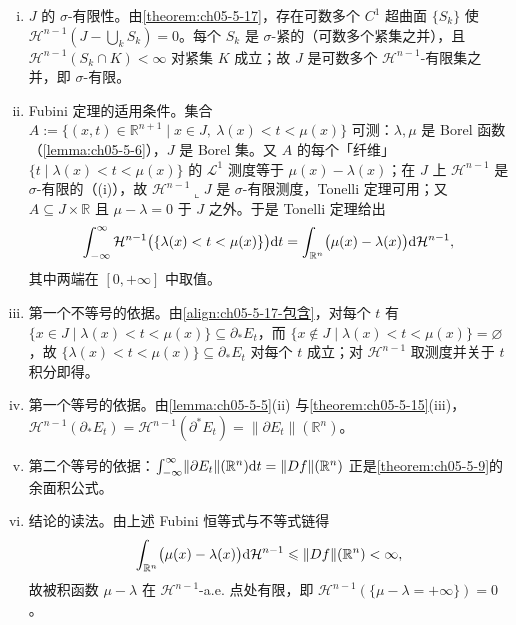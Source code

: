 \documentclass[../../main.tex]{subfiles}%
\begin{document}
\begin{remark}\label{remark:ch05-thm-5-18-论证二}
\begin{enumerate}[(i)]
\item $J$ 的 $\sigma$-有限性。由\cref{theorem:ch05-5-17}，存在可数多个 $C^1$ 超曲面 $\{S_k\}$ 使 $\mathcal{H}^{n-1}(J-\bigcup_{k}S_k)=0$。每个 $S_k$ 是 $\sigma$-紧的（可数多个紧集之并），且 $\mathcal{H}^{n-1}(S_k\cap K)<\infty$ 对紧集 $K$ 成立；故 $J$ 是可数多个 $\mathcal{H}^{n-1}$-有限集之并，即 $\sigma$-有限。%
\item Fubini 定理的适用条件。集合 $A:=\{(x,t)\in\mathbb{R}^{n+1}\mid x\in J,\ \lambda(x)<t<\mu(x)\}$ 可测：$\lambda,\mu$ 是 Borel 函数（\cref{lemma:ch05-5-6}），$J$ 是 Borel 集。又 $A$ 的每个「纤维」$\{t\mid\lambda(x)<t<\mu(x)\}$ 的 $\mathcal{L}^1$ 测度等于 $\mu(x)-\lambda(x)$；在 $J$ 上 $\mathcal{H}^{n-1}$ 是 $\sigma$-有限的（(i)），故 $\mathcal{H}^{n-1}\llcorner J$ 是 $\sigma$-有限测度，Tonelli 定理可用；又 $A\subseteq J\times\mathbb{R}$ 且 $\mu-\lambda=0$ 于 $J$ 之外。于是 Tonelli 定理给出%
\begin{align*}
\int_{-\infty}^{\infty}\mathcal{H}^{n-1}\bigl(\{\lambda(x)<t<\mu(x)\}\bigr)\mathrm{d} t=\int_{\mathbb{R}^n}\bigl(\mu(x)-\lambda(x)\bigr)\mathrm{d}\mathcal{H}^{n-1} ,
\end{align*}
其中两端在 $[0,+\infty]$ 中取值。
\item 第一个不等号的依据。由\eqref{align:ch05-5-17-包含}，对每个 $t$ 有 $\{x\in J\mid\lambda(x)<t<\mu(x)\}\subseteq\partial_*E_t$，而 $\{x\notin J\mid\lambda(x)<t<\mu(x)\}=\varnothing$，故 $\{\lambda(x)<t<\mu(x)\}\subseteq\partial_*E_t$ 对每个 $t$ 成立；对 $\mathcal{H}^{n-1}$ 取测度并关于 $t$ 积分即得。
\item 第一个等号的依据。由\cref{lemma:ch05-5-5}(ii) 与\cref{theorem:ch05-5-15}(iii)，$\mathcal{H}^{n-1}(\partial_*E_t)=\mathcal{H}^{n-1}(\partial^*E_t)=\lVert\partial E_t\rVert(\mathbb{R}^n)$。%
\item 第二个等号的依据：$\int_{-\infty}^{\infty}\lVert\partial E_t\rVert(\mathbb{R}^n)\mathrm{d} t=\lVert Df\rVert(\mathbb{R}^n)$ 正是\cref{theorem:ch05-5-9}的余面积公式。%
\item 结论的读法。由上述 Fubini 恒等式与不等式链得
\begin{align*}
\int_{\mathbb{R}^n}\bigl(\mu(x)-\lambda(x)\bigr)\mathrm{d}\mathcal{H}^{n-1}\leqslant\lVert Df\rVert(\mathbb{R}^n)<\infty ,
\end{align*}
故被积函数 $\mu-\lambda$ 在 $\mathcal{H}^{n-1}$-a.e. 点处有限，即 $\mathcal{H}^{n-1}(\{\mu-\lambda=+\infty\})=0$。
\end{enumerate}
\end{remark}
\end{document}
